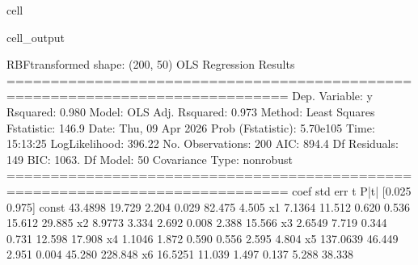 \documentclass[letterpaper,10pt,english]{jupyterBook}
\begin{document}
\begin{sphinxuseclass}{cell}
\begin{sphinxVerbatimOutput}
\begin{sphinxuseclass}{cell_output}
\begin{sphinxVerbatim}[commandchars=\\\{\}]
RBF\PYGZhy{}transformed shape: (200, 50)
                            OLS Regression Results                            
==============================================================================
Dep. Variable:                      y   R\PYGZhy{}squared:                       0.980
Model:                            OLS   Adj. R\PYGZhy{}squared:                  0.973
Method:                 Least Squares   F\PYGZhy{}statistic:                     146.9
Date:                Thu, 09 Apr 2026   Prob (F\PYGZhy{}statistic):          5.70e\PYGZhy{}105
Time:                        15:13:25   Log\PYGZhy{}Likelihood:                \PYGZhy{}396.22
No. Observations:                 200   AIC:                             894.4
Df Residuals:                     149   BIC:                             1063.
Df Model:                          50                                         
Covariance Type:            nonrobust                                         
==============================================================================
                 coef    std err          t      P\PYGZgt{}|t|      [0.025      0.975]
\PYGZhy{}\PYGZhy{}\PYGZhy{}\PYGZhy{}\PYGZhy{}\PYGZhy{}\PYGZhy{}\PYGZhy{}\PYGZhy{}\PYGZhy{}\PYGZhy{}\PYGZhy{}\PYGZhy{}\PYGZhy{}\PYGZhy{}\PYGZhy{}\PYGZhy{}\PYGZhy{}\PYGZhy{}\PYGZhy{}\PYGZhy{}\PYGZhy{}\PYGZhy{}\PYGZhy{}\PYGZhy{}\PYGZhy{}\PYGZhy{}\PYGZhy{}\PYGZhy{}\PYGZhy{}\PYGZhy{}\PYGZhy{}\PYGZhy{}\PYGZhy{}\PYGZhy{}\PYGZhy{}\PYGZhy{}\PYGZhy{}\PYGZhy{}\PYGZhy{}\PYGZhy{}\PYGZhy{}\PYGZhy{}\PYGZhy{}\PYGZhy{}\PYGZhy{}\PYGZhy{}\PYGZhy{}\PYGZhy{}\PYGZhy{}\PYGZhy{}\PYGZhy{}\PYGZhy{}\PYGZhy{}\PYGZhy{}\PYGZhy{}\PYGZhy{}\PYGZhy{}\PYGZhy{}\PYGZhy{}\PYGZhy{}\PYGZhy{}\PYGZhy{}\PYGZhy{}\PYGZhy{}\PYGZhy{}\PYGZhy{}\PYGZhy{}\PYGZhy{}\PYGZhy{}\PYGZhy{}\PYGZhy{}\PYGZhy{}\PYGZhy{}\PYGZhy{}\PYGZhy{}\PYGZhy{}\PYGZhy{}
const        \PYGZhy{}43.4898     19.729     \PYGZhy{}2.204      0.029     \PYGZhy{}82.475      \PYGZhy{}4.505
x1             7.1364     11.512      0.620      0.536     \PYGZhy{}15.612      29.885
x2             8.9773      3.334      2.692      0.008       2.388      15.566
x3             2.6549      7.719      0.344      0.731     \PYGZhy{}12.598      17.908
x4             1.1046      1.872      0.590      0.556      \PYGZhy{}2.595       4.804
x5           137.0639     46.449      2.951      0.004      45.280     228.848
x6            16.5251     11.039      1.497      0.137      \PYGZhy{}5.288      38.338

\end{sphinxVerbatim}
\end{sphinxuseclass}
\end{sphinxVerbatimOutput}
\end{sphinxuseclass}
\end{document}
